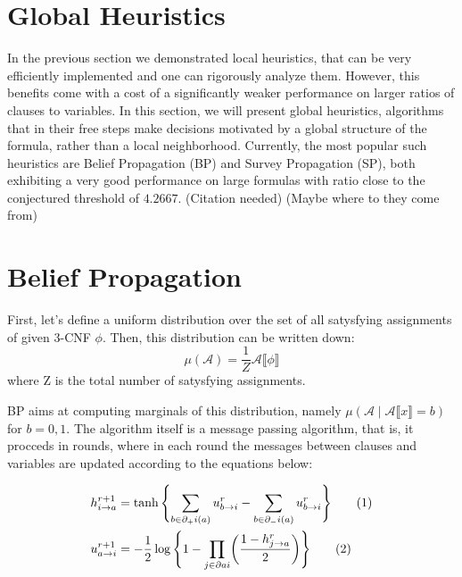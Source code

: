 \documentclass[10pt]{article}
\newcommand{\dbrackets}[1]{\llbracket#1\rrbracket}
\newcommand{\numberthis}{\addtocounter{equation}{1}\tag{\theequation}}
\newcommand{\umsg}[3]{u_{#1\rightarrow#2}^{#3}}
\newcommand{\hmsg}[3]{h_{#1\rightarrow#2}^{#3}}
\begin{document}
\section{Global Heuristics}
In the previous section we demonstrated local heuristics, that can be very efficiently implemented and one can rigorously analyze them. However, this benefits come with a cost of a significantly weaker performance on larger ratios of clauses to variables. In this section, we will present global heuristics, algorithms that in their free steps make decisions motivated by a global structure of the formula, rather than a local neighborhood. Currently, the most popular such heuristics are Belief Propagation (BP) and Survey Propagation (SP), both exhibiting a very good performance on large formulas with ratio close to the conjectured threshold of $4.2667$. (Citation needed)
(Maybe where to they come from)
\section{Belief Propagation}
First, let's define a uniform distribution over the set of all satysfying assignments of given 3-CNF $\phi$. Then, this distribution can be written down:
\begin{equation}
\label{eq:uniform}
\mu(\mathcal{A}) = \frac{1}{Z} \mathcal{A} \dbrackets{\phi}
\end{equation}
where Z is the total number of satysfying assignments. 
\par 
BP aims at computing marginals of this distribution, namely $\mu(\mathcal{A} \mid \mathcal{A} \dbrackets{x} = b)$ for $b = 0, 1$. The algorithm itself is a message passing algorithm, that is, it procceds in rounds, where in each round the messages between clauses and variables are updated according to the equations below:

\begin{align}
    \hmsg{i}{a}{r+1} &= \tanh{ \Biggl\{ \sum_{b \in {\partial_+}i(a)} \umsg{b}{i}{r} - \sum_{b \in {\partial_-}i(a)} \umsg{b}{i}{r} \Biggr\} }
    \numberthis \label{eq:messages:h} \\
    \umsg{a}{i}{r+1} &= - \frac{1}{2} \log{ \Biggl\{ 1 - \prod_{j \in \partial a  i}  \biggl(\frac{1 - \hmsg{j}{a}{r}}{2} \biggr) \Biggr\}}
    \numberthis \label{eq:message:u}
\end{align}
\end{document}
